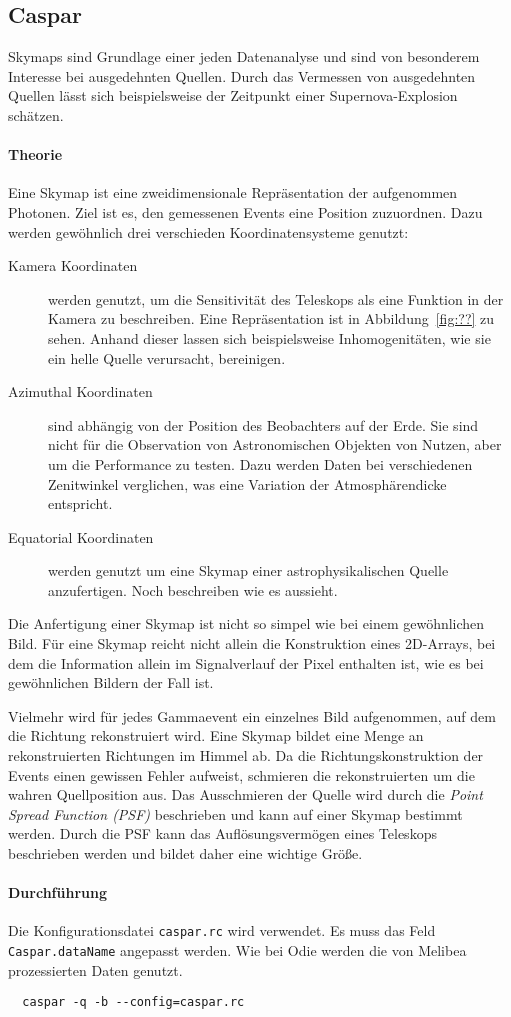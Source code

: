\subsection{Caspar}%
\label{sub:caspar}
Skymaps sind Grundlage einer jeden Datenanalyse
und sind von besonderem Interesse bei ausgedehnten Quellen.
Durch das Vermessen von ausgedehnten Quellen
lässt sich beispielsweise der Zeitpunkt einer Supernova-Explosion schätzen.

\paragraph{Theorie}%
\label{par:theorie}
Eine Skymap ist eine zweidimensionale Repräsentation der aufgenommen Photonen.
Ziel ist es, den gemessenen Events eine Position zuzuordnen.
Dazu werden ge\-wöhn\-lich drei verschieden Koordinatensysteme genutzt:

\begin{description}
	\item[\quad Kamera Koordinaten] werden genutzt, um die Sensitivität des
    Teleskops
		als eine Funktion in der Kamera zu beschreiben.
		Eine Repräsentation ist in Abbildung~\ref{fig:??} zu sehen.
		Anhand dieser lassen sich beispielsweise Inhomogenitäten,
		wie sie ein helle Quelle verursacht, bereinigen.

	\item[\quad Azimuthal Koordinaten] sind abhängig von der Position des
		Beobachters auf der Erde.
		Sie sind nicht für die Observation von Astronomischen Objekten von Nutzen,
		aber um die Performance zu testen.
		Dazu werden Daten bei verschiedenen Zenitwinkel verglichen,
    was eine Variation der Atmosphärendicke entspricht.

	\item[\quad Equatorial Koordinaten] werden genutzt um eine Skymap einer
		astrophysikalischen Quelle anzufertigen.
    {\color{red} Noch beschreiben wie es aussieht.}
\end{description}

Die Anfertigung einer Skymap ist nicht so simpel wie bei einem gewöhnlichen
Bild.
Für eine Skymap reicht nicht allein die Konstruktion eines 2D-Arrays,
bei dem die Information allein im Signalverlauf der Pixel enthalten ist,
wie es bei gewöhnlichen Bildern der Fall ist.

Vielmehr wird für jedes Gammaevent ein einzelnes Bild aufgenommen,
auf dem die Richtung rekonstruiert wird.
Eine Skymap bildet eine Menge an rekonstruierten Richtungen im Himmel ab.
Da die Richtungskonstruktion der Events einen gewissen Fehler aufweist,
schmieren die rekonstruierten um die wahren Quellposition aus.
Das Ausschmieren der Quelle wird durch die \textit{Point Spread Function (PSF)}
beschrieben
und kann auf einer Skymap bestimmt werden.
Durch die PSF kann das Auflösungsvermögen eines Teleskops
beschrieben werden und bildet daher eine wichtige Größe.

\paragraph{Durchführung}%

Die Konfigurationsdatei \texttt{caspar.rc} wird verwendet.
Es muss das Feld \texttt{Caspar.dataName} angepasst werden.
Wie bei Odie werden die von Melibea prozessierten Daten genutzt.


\begin{lstlisting}
  caspar -q -b --config=caspar.rc
\end{lstlisting}
